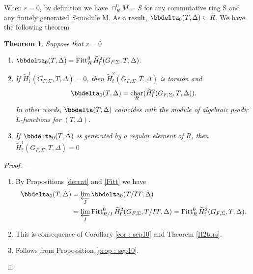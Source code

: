 \documentclass[10pt]{amsart}
\numberwithin{equation}{section}
\newtheorem{thm}{Theorem}[section]
\theoremstyle{definition}
\theoremstyle{remark} %
\DeclareMathOperator{\Char}{char}
\newcommand{\Fitt}{\operatorname{Fitt}}
\begin{document}
		\subsubsection{}
		When $r=0$, by definition we have $ \cap_R^0 M = S$ for any commutative ring S and any finitely generated $S$-module M. As a result, $ \bbdelta_0(T,\Delta) \subset R $. We have the following theorem %
		\begin{thm}
			\label{r0}
			Suppose that $ r=0 $
			\begin{enumerate}
				\item $ \bbdelta_0(T,\Delta) = \Fitt^0_R \widetilde{H}^2_{\mathrm{f}}(G_{F,\Sigma},T,\Delta) $.
				\item If $ \widetilde{H}^1_{\mathrm{f}}(G_{F,\Sigma}, T, \Delta)=0 $, then $ \widetilde{H}^2_{\mathrm{f}}(G_{F,\Sigma},T,\Delta) $ is torsion and $$ \bbdelta_0(T,\Delta)= \Char_R(\widetilde{H}^2_{\mathrm{f}}(G_{F,\Sigma}, T, \Delta)) .$$
				In other words, $ \bbdelta(T,\Delta) $ coincides with the module of algebraic $p$-adic $L$-functions for $(T,\Delta)$.
				\item If $ \bbdelta_0(T,\Delta) $ is generated by a regular element of $R$, then $ \widetilde{H}^1_{\mathrm{f}}(G_{F,\Sigma}, T, \Delta)=0 $
			\end{enumerate}
		\end{thm}  
		\begin{proof} ---
			\begin{enumerate}
				\item By Propositions \ref{dercat} and \ref{Fitt} we have
				\[
				\begin{split}
					\bbdelta_0(T,\Delta) &= \varprojlim_I \bbdelta_0(T/IT,\Delta) \\
					&= \varprojlim_I \Fitt^0_{R/I}\widetilde{H}^2_{\mathrm{f}}(G_{F,\Sigma},T /IT,\Delta) = \Fitt^0_{R}\widetilde{H}^2_{\mathrm{f}}(G_{F,\Sigma},T,\Delta).
				\end{split}
				\]
				\item This is consequence of Corollary \ref{cor : sep10} and Theorem \ref{H2tors}.
				\item Follows from Propossition \ref{prop : sep10}. 
			\end{enumerate}
		\end{proof}
\end{document}
